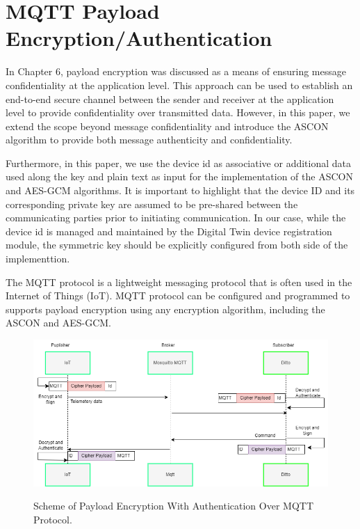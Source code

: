 
\section{MQTT Payload Encryption/Authentication }

In Chapter 6, payload encryption was discussed as a means of ensuring message confidentiality at the application level. This approach can be used to establish an end-to-end secure channel between the sender and receiver at the application level  to provide confidentiality over transmitted data. However, in this paper, we extend the scope beyond message confidentiality and introduce the ASCON algorithm to provide both message authenticity and confidentiality.

Furthermore, in this paper, we use the device id as associative or additional data used along the key and plain text as input for the implementation of the ASCON and AES-GCM algorithms. It is important to highlight that the device ID and its corresponding private key are assumed to be pre-shared between the communicating parties prior to initiating communication. In our case, while the device id is managed and maintained by the Digital Twin device registration module, the symmetric key should be explicitly configured from both side of the implementtion.  

The MQTT protocol is a lightweight messaging protocol that is often used in the Internet of Things (IoT). MQTT protocol can be configured and programmed to supports payload encryption using any encryption algorithm, including the ASCON and AES-GCM. 


\begin{figure}[H]
    \caption{Scheme of Payload Encryption With Authentication Over MQTT Protocol. }
    \centering
    \includegraphics[width=\textwidth]{images/fp/payloadenc.drawio.png}
    \label{fig:payload-encauth-schem}
\end{figure}

